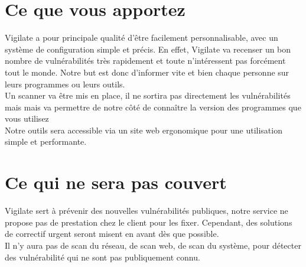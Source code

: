 \section{Ce que vous apportez}
\thispagestyle{plain}

Vigilate a pour principale qualité d’être facilement personnalisable, avec un système de configuration simple et précis. En effet, Vigilate va recenser un bon nombre de vulnérabilités très rapidement et toute n’intéressent pas forcément tout le monde. Notre but est donc d’informer vite et bien chaque personne sur leurs programmes ou leurs outils.\\
Un scanner va être mis en place, il ne sortira pas directement les vulnérabilités mais mais va permettre de notre côté de connaître la version des programmes que vous utilisez\\
Notre outils sera accessible via un site web ergonomique pour une utilisation simple et performante.\\

\section{Ce qui ne sera pas couvert}
\thispagestyle{plain}
Vigilate sert à prévenir des nouvelles vulnérabilités publiques, notre service ne propose pas de prestation chez le client pour les fixer. Cependant, des solutions de correctif urgent seront misent en avant dès que possible.\\
Il n’y aura pas de scan du réseau, de scan web, de scan du système, pour détecter des vulnérabilité qui ne sont pas publiquement connu.\\
